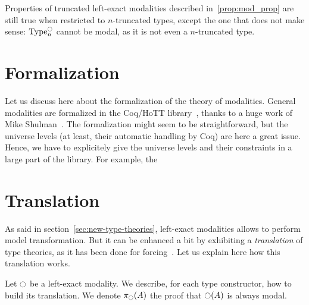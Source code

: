 Properties of truncated left-exact modalities described
in~\ref{prop:mod_prop} are still true when restricted to $n$-truncated
types, except the one that does not make sense: $\operatorname{Type}_n^{\ocircle}$
cannot be modal, as it is not even a $n$-truncated type.

\section{Formalization}
\label{sec:mod-formalization}

Let us discuss here about the formalization of the theory of
modalities. General modalities are formalized in the Coq/HoTT
library~\cite{hottlib}, thanks to a huge work of Mike
Shulman~\cite{modules-modalities}. The formalization might seem to be
straightforward, but the universe levels (at least, their automatic
handling by Coq) are here a great issue. Hence, we have to explicitely
give the universe levels and their constraints in a large part of the
library. For example, the 




\section{Translation}
\label{sec:translation}

As said in section~\ref{sec:new-type-theories}, left-exact modalities
allows to perform model transformation. But it can be enhanced a bit
by exhibiting a {\em translation} of type theories, as it has been done for
forcing~\cite{jaber2012extending}. Let us explain
here how this translation works.

Let $\ocircle$ be a left-exact modality. We describe, for each type
constructor, how to build its translation. We denote $\pi_{\ocircle}(A)$
the proof that $\ocircle(A)$ is always modal.

